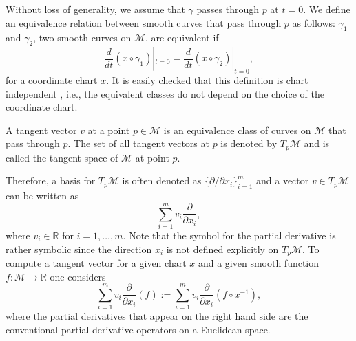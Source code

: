  Without loss of generality, we assume that $\gamma$ passes through $p$ at $t=0$. We define an equivalence relation between smooth curves that pass through $p$ as follows: $\gamma_1$ and $\gamma_2$, two smooth curves on $\mathcal M$, are equivalent if
\begin{equation} \label{eq:2.1}
	\frac{d}{dt}(x\circ \gamma_1)|_{t=0} = \frac{d}{dt}(x\circ \gamma_2)|_{t=0},
\end{equation}
for a coordinate chart $x$. It is easily checked that this definition is chart independent \cite{abraham1978foundations}, i.e., the equivalent classes do not depend on the choice of the coordinate chart.
\begin{definition}
A tangent vector $v$ at a point $p\in \mathcal M$ is an equivalence class of curves on $\mathcal M$ that pass through $p$. The set of all tangent vectors at $p$ is denoted by $T_p\mathcal M$ and is called the tangent space of $\mathcal M$ at point $p$.
\end{definition}

 Therefore, a basis for $T_p\mathcal M$ is often denoted as $\{ \partial /\partial x_i \}_{i=1}^{m}$ and a vector $v\in T_p\mathcal M$ can be written as 
\begin{equation} \label{eq:2.11}
	\sum_{i=1}^m v_i \frac{\partial}{\partial x_i},
\end{equation}
where $v_i\in \mathbb R$ for $i = 1,\dots,m$. Note that the symbol for the partial derivative is rather symbolic since the direction $x_i$ is not defined explicitly on $T_p\mathcal M$. To compute a tangent vector for a given chart $x$ and a given smooth function $f:\mathcal M \to \mathbb R$ one considers
\begin{equation} \label{eq:2.12}
	\sum_{i=1}^m v_i \frac{\partial}{\partial x_i} (f) := \sum_{i=1}^m v_i \frac{\partial}{\partial x_i} (f \circ x^{-1}),
\end{equation}
where the partial derivatives that appear on the right hand side are the conventional partial derivative operators on a Euclidean space.

